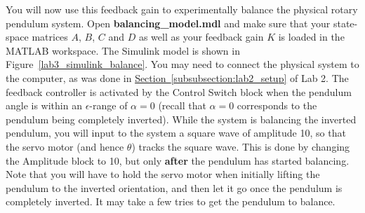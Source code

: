 \documentclass[12pt]{report}
\begin{document}
You will now use this feedback gain to experimentally balance the physical rotary pendulum system. Open \textbf{balancing\_model.mdl} and make sure that your state-space matrices $A$, $B$, $C$ and $D$ as well as your feedback gain $K$ is loaded in the MATLAB workspace. The Simulink model is shown in Figure~\ref{lab3_simulink_balance}. You may need to connect the physical system to the computer, as was done in \hyperref[subsubsection:lab2_setup]{Section~\ref{subsubsection:lab2_setup}} of Lab 2. The feedback controller is activated by the Control Switch block when the pendulum angle is within an $\epsilon$-range of $\alpha = 0$ (recall that $\alpha=0$ corresponds to the pendulum being completely inverted). While the system is balancing the inverted pendulum, you will input to the system a square wave of amplitude 10, so that the servo motor (and hence $\theta$) tracks the square wave. This is done by changing the Amplitude block to 10, but only \textbf{after} the pendulum has started balancing. Note that you will have to hold the servo motor when initially lifting the pendulum to the inverted orientation, and then let it go once the pendulum is completely inverted. It may take a few tries to get the pendulum to balance.
\end{document}
